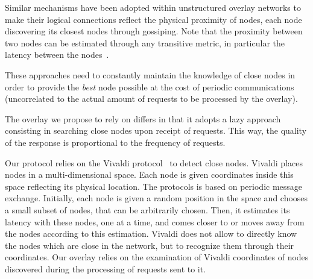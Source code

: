Similar mechanisms have been adopted within unstructured overlay networks to
make their logical connections reflect the physical proximity of nodes, each
node discovering its closest nodes through gossiping. Note that the proximity
between two nodes can be estimated through any transitive metric, in particular
the latency between the nodes~\cite{refquivabienmarindoittrouver}.

These approaches need to constantly maintain the knowledge of close nodes in
order to provide the \emph{best} node possible at the cost of periodic
communications (uncorrelated to the actual amount of requests to be processed by
the overlay).

The overlay we propose to rely on differs in that it adopts a lazy approach consisting
in searching close nodes upon receipt of requests. This way, the quality of the
response is proportional to the frequency of requests. 


Our protocol relies on the Vivaldi protocol~\cite{dabek:2001:sigcomm04} to
detect close nodes. Vivaldi places nodes in a multi-dimensional space. Each node
is given coordinates inside this space reflecting its physical location. The
protocols is based on periodic message exchange. Initially, each node is given a
random position in the space and chooses a small subset of nodes, that can be
arbitrarily chosen. Then, it estimates its latency with these nodes, one at a
time, and comes closer to or moves away from the nodes according to this
estimation. Vivaldi does not allow to directly know the nodes which are close in
the network, but to recognize them through their coordinates. Our overlay relies
on the examination of Vivaldi coordinates of nodes discovered during the
processing of requests sent to it.






